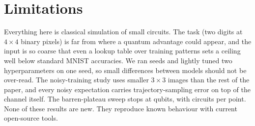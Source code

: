 \section{Limitations}
\label{sec:limitations}

Everything here is classical simulation of small circuits. The task (two digits at $4\times4$ binary
pixels) is far from where a quantum advantage could appear, and the input is so coarse that even a
lookup table over training patterns sets a ceiling well below standard MNIST accuracies. We ran
\valMnistSeeds{} seeds and lightly tuned two hyperparameters on one seed, so small differences
between models should not be over-read. The noisy-training study uses smaller $3\times3$ images than the
rest of the paper, and every noisy expectation carries trajectory-sampling error on top of the channel
itself. The barren-plateau sweep stops at \valBpMaxQ{} qubits, with \valBpCircuits{} circuits per point.
None of these results are new. They reproduce known behaviour with current open-source tools.
